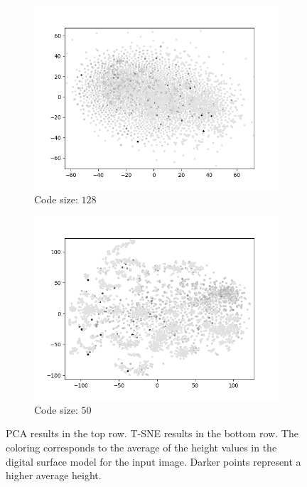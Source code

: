 \begin{figure}[H]
\begin{subfigure}{.25\textwidth}
        \includegraphics[width=\textwidth]{images/figures/experiments_latent/pooling_dim1024_dsm.png}  
        \caption{Code size: $128$} 
    \end{subfigure}%
    \begin{subfigure}{.25\textwidth}
        \centering
        \includegraphics[width=\textwidth]{images/figures/experiments_latent/pooling_dim50_dsm.png}
        \caption{Code size: $50$}
    \end{subfigure}
    \caption{PCA results in the top row. 
    T-SNE results in the bottom row. 
    The coloring corresponds to the average of the height values in the digital surface model for the
    input image. Darker points represent a higher average height.}
\end{figure} \label{figure_heights_pooling}


